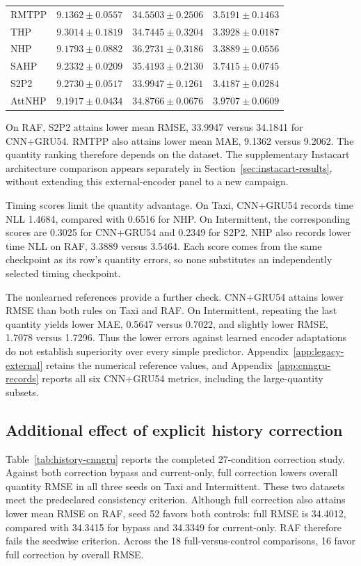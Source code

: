 \documentclass[runningheads]{llncs}
\begin{document}
\begin{table}[t]
\begin{tabular}{@{}lrrr@{}}
RMTPP & $\mathbf{9.1362\pm0.0557}$ & $34.5503\pm0.2506$ & $3.5191\pm0.1463$\\
THP & $9.3014\pm0.1819$ & $34.7445\pm0.3204$ & $3.3928\pm0.0187$\\
NHP & $9.1793\pm0.0882$ & $36.2731\pm0.3186$ & $\mathbf{3.3889\pm0.0556}$\\
SAHP & $9.2332\pm0.0209$ & $35.4193\pm0.2130$ & $3.7415\pm0.0745$\\
S2P2 & $9.2730\pm0.0517$ & $\mathbf{33.9947\pm0.1261}$ & $3.4187\pm0.0284$\\
AttNHP & $9.1917\pm0.0434$ & $34.8766\pm0.0676$ & $3.9707\pm0.0609$\\
\bottomrule
\end{tabular}
\end{table}

On RAF, S2P2 attains lower mean RMSE, 33.9947 versus 34.1841 for CNN+GRU54. RMTPP also attains lower mean MAE, 9.1362 versus 9.2062. The quantity ranking therefore depends on the dataset. The supplementary Instacart architecture comparison appears separately in Section~\ref{sec:instacart-results}, without extending this external-encoder panel to a new campaign.

Timing scores limit the quantity advantage. On Taxi, CNN+GRU54 records time NLL 1.4684, compared with 0.6516 for NHP. On Intermittent, the corresponding scores are 0.3025 for CNN+GRU54 and 0.2349 for S2P2. NHP also records lower time NLL on RAF, 3.3889 versus 3.5464. Each score comes from the same checkpoint as its row's quantity errors, so none substitutes an independently selected timing checkpoint.

The nonlearned references provide a further check. CNN+GRU54 attains lower RMSE than both rules on Taxi and RAF. On Intermittent, repeating the last quantity yields lower MAE, 0.5647 versus 0.7022, and slightly lower RMSE, 1.7078 versus 1.7296. Thus the lower errors against learned encoder adaptations do not establish superiority over every simple predictor. Appendix~\ref{app:legacy-external} retains the numerical reference values, and Appendix~\ref{app:cnngru-records} reports all six CNN+GRU54 metrics, including the large-quantity subsets.

\subsection{Additional effect of explicit history correction}
\label{sec:history-results}
Table~\ref{tab:history-cnngru} reports the completed 27-condition correction study. Against both correction bypass and current-only, full correction lowers overall quantity RMSE in all three seeds on Taxi and Intermittent. These two datasets meet the predeclared consistency criterion. Although full correction also attains lower mean RMSE on RAF, seed 52 favors both controls: full RMSE is 34.4012, compared with 34.3415 for bypass and 34.3349 for current-only. RAF therefore fails the seedwise criterion. Across the 18 full-versus-control comparisons, 16 favor full correction by overall RMSE.
\end{document}

